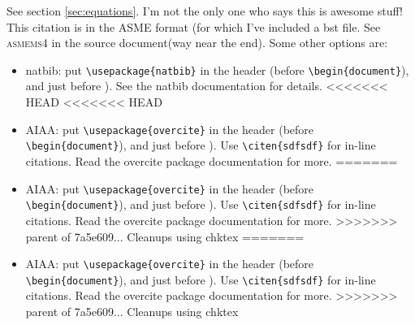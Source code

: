 \documentclass[12pt]{report}
\begin{document}
See section \ref{sec:equations}. I'm not the only one who says this is awesome stuff\cite{Mortara2004}!
This citation is in the ASME format (for which I've included a bst file. See \textsc{asmems4} in the source document(way near the end). Some  other options are:
\begin{itemize}
\item natbib:  put \verb'\usepackage{natbib}' in the header (before \verb'\begin{document}'), and \verb'' just before \verb'').  See the natbib documentation for details.
<<<<<<< HEAD
<<<<<<< HEAD
\item AIAA:  put \verb'\usepackage{overcite}' in the header (before \verb'\begin{document}'), and \verb'' just before \verb''). Use \verb'\citen{sdfsdf}' for in-line citations. Read the overcite package documentation for more.
=======
\item AIAA:  put \verb'\usepackage{overcite}' in the header (before \verb'\begin{document}'), and \verb'' just before \verb''). Use \verb'\citen{sdfsdf}' for in-line citations. Read the overcite package documentation for more. 
>>>>>>> parent of 7a5e609... Cleanups using chktex
=======
\item AIAA:  put \verb'\usepackage{overcite}' in the header (before \verb'\begin{document}'), and \verb'' just before \verb''). Use \verb'\citen{sdfsdf}' for in-line citations. Read the overcite package documentation for more. 
>>>>>>> parent of 7a5e609... Cleanups using chktex
\end{itemize}
\end{document}
